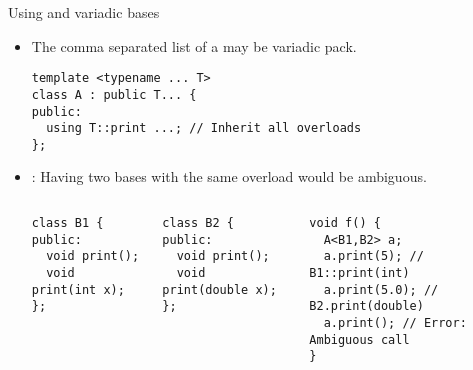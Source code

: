 \begin{frame}[t,fragile]{Using and variadic bases}
\begin{itemize}
  \item The comma separated list of a 
        may be variadic pack.
\begin{lstlisting}
template <typename ... T>
class A : public T... {
public:
  using T::print ...; // Inherit all overloads
};
\end{lstlisting}

  \item {}: Having two bases with the same overload would be ambiguous.

\begin{columns}[T]

\begin{lstlisting}
class B1 {
public:
  void print();
  void print(int x);
};
\end{lstlisting}
\begin{lstlisting}
class B2 {
public:
  void print();
  void print(double x);
};
\end{lstlisting}
\begin{lstlisting}
void f() {
  A<B1,B2> a;
  a.print(5); // B1::print(int)
  a.print(5.0); // B2.print(double)
  a.print(); // Error: Ambiguous call
}
\end{lstlisting}
\end{columns}
\end{itemize}
\end{frame}


